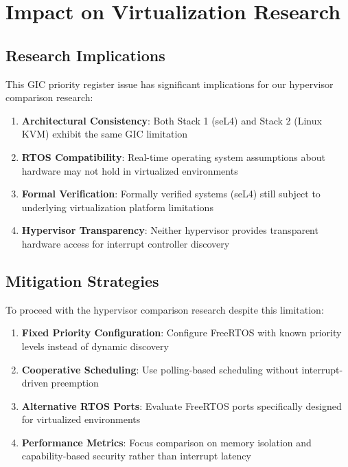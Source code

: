\documentclass[12pt,a4paper]{article}
\begin{document}
\section{Impact on Virtualization Research}

\subsection{Research Implications}

This GIC priority register issue has significant implications for our hypervisor comparison research:

\begin{enumerate}
    \item \textbf{Architectural Consistency}: Both Stack 1 (seL4) and Stack 2 (Linux KVM) exhibit the same GIC limitation
    \item \textbf{RTOS Compatibility}: Real-time operating system assumptions about hardware may not hold in virtualized environments
    \item \textbf{Formal Verification}: Formally verified systems (seL4) still subject to underlying virtualization platform limitations
    \item \textbf{Hypervisor Transparency}: Neither hypervisor provides transparent hardware access for interrupt controller discovery
\end{enumerate}

\subsection{Mitigation Strategies}

To proceed with the hypervisor comparison research despite this limitation:

\begin{enumerate}
    \item \textbf{Fixed Priority Configuration}: Configure FreeRTOS with known priority levels instead of dynamic discovery
    \item \textbf{Cooperative Scheduling}: Use polling-based scheduling without interrupt-driven preemption
    \item \textbf{Alternative RTOS Ports}: Evaluate FreeRTOS ports specifically designed for virtualized environments
    \item \textbf{Performance Metrics}: Focus comparison on memory isolation and capability-based security rather than interrupt latency
\end{enumerate}
\end{document}
